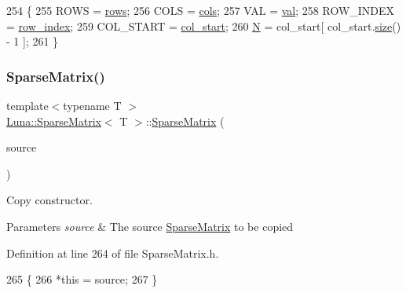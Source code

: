 \begin{DoxyCode}
254   \{
255     ROWS = \hyperlink{classLuna_1_1SparseMatrix_a970319496e5f0b963e4810f2ecbd93b6}{rows};
256     COLS = \hyperlink{classLuna_1_1SparseMatrix_aff9e25ce05b5d11c3490f37fcd2ccfb0}{cols};
257     VAL = \hyperlink{classLuna_1_1SparseMatrix_ac22d87e2fb618c6140c579bc72dd503b}{val};
258     ROW\_INDEX = \hyperlink{classLuna_1_1SparseMatrix_a3a430b487f83ac9ef35ed322e1b94c29}{row\_index};
259     COL\_START = \hyperlink{classLuna_1_1SparseMatrix_a5183843e7b13b0b359a9c98a91b30f6a}{col\_start};
260     \hyperlink{namespaceHeat__plot_a7d050092798e28458a263710837bda77}{N} = col\_start[ col\_start.\hyperlink{classLuna_1_1Vector_ac9b6ed7a0df401728f27c193fbc8f4d8}{size}() - 1 ];
261   \}
\end{DoxyCode}
\mbox{\label{classLuna_1_1SparseMatrix_a34b67d3b42dcc132e0806a8d9958b4b2}} 
\subsubsection{\texorpdfstring{Sparse\+Matrix()}{SparseMatrix()}\hspace{0.1cm}{\footnotesize\ttfamily [5/5]}}
{\footnotesize\ttfamily template$<$typename T $>$ \\
\hyperlink{classLuna_1_1SparseMatrix}{Luna\+::\+Sparse\+Matrix}$<$ T $>$\+::\hyperlink{classLuna_1_1SparseMatrix}{Sparse\+Matrix} (\begin{DoxyParamCaption}\item[{const \hyperlink{classLuna_1_1SparseMatrix}{Sparse\+Matrix}$<$ T $>$ \&}]{source }\end{DoxyParamCaption})\hspace{0.3cm}{\ttfamily [inline]}}



Copy constructor. 


\begin{DoxyParams}{Parameters}
{\em source} & The source \hyperlink{classLuna_1_1SparseMatrix}{Sparse\+Matrix} to be copied \\
\hline
\end{DoxyParams}


Definition at line 264 of file Sparse\+Matrix.\+h.


\begin{DoxyCode}
265   \{
266     *\textcolor{keyword}{this} = source;
267   \}
\end{DoxyCode}
\mbox{\label{classLuna_1_1SparseMatrix_a19932e29b8a65748e44025611c587ccc}} 
